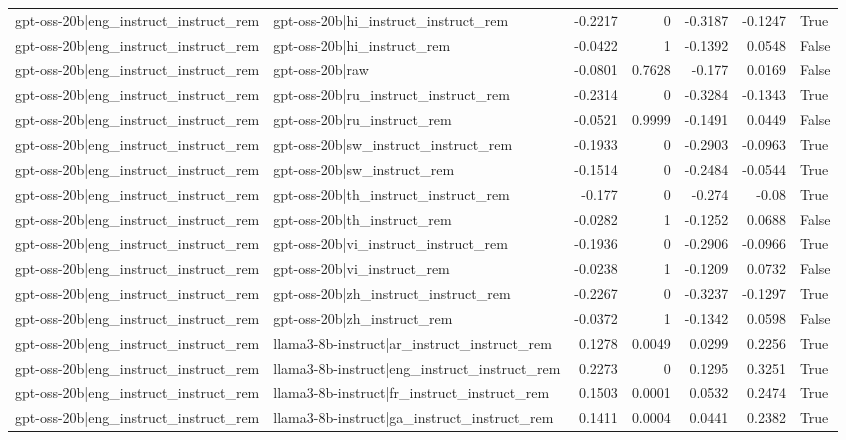 \begin{table}
\begin{tabular}{l l r r r r l}
gpt-oss-20b|eng_instruct_instruct_rem & gpt-oss-20b|hi_instruct_instruct_rem & -0.2217 & 0 & -0.3187 & -0.1247 & True \\
gpt-oss-20b|eng_instruct_instruct_rem & gpt-oss-20b|hi_instruct_rem & -0.0422 & 1 & -0.1392 & 0.0548 & False \\
gpt-oss-20b|eng_instruct_instruct_rem & gpt-oss-20b|raw & -0.0801 & 0.7628 & -0.177 & 0.0169 & False \\
gpt-oss-20b|eng_instruct_instruct_rem & gpt-oss-20b|ru_instruct_instruct_rem & -0.2314 & 0 & -0.3284 & -0.1343 & True \\
gpt-oss-20b|eng_instruct_instruct_rem & gpt-oss-20b|ru_instruct_rem & -0.0521 & 0.9999 & -0.1491 & 0.0449 & False \\
gpt-oss-20b|eng_instruct_instruct_rem & gpt-oss-20b|sw_instruct_instruct_rem & -0.1933 & 0 & -0.2903 & -0.0963 & True \\
gpt-oss-20b|eng_instruct_instruct_rem & gpt-oss-20b|sw_instruct_rem & -0.1514 & 0 & -0.2484 & -0.0544 & True \\
gpt-oss-20b|eng_instruct_instruct_rem & gpt-oss-20b|th_instruct_instruct_rem & -0.177 & 0 & -0.274 & -0.08 & True \\
gpt-oss-20b|eng_instruct_instruct_rem & gpt-oss-20b|th_instruct_rem & -0.0282 & 1 & -0.1252 & 0.0688 & False \\
gpt-oss-20b|eng_instruct_instruct_rem & gpt-oss-20b|vi_instruct_instruct_rem & -0.1936 & 0 & -0.2906 & -0.0966 & True \\
gpt-oss-20b|eng_instruct_instruct_rem & gpt-oss-20b|vi_instruct_rem & -0.0238 & 1 & -0.1209 & 0.0732 & False \\
gpt-oss-20b|eng_instruct_instruct_rem & gpt-oss-20b|zh_instruct_instruct_rem & -0.2267 & 0 & -0.3237 & -0.1297 & True \\
gpt-oss-20b|eng_instruct_instruct_rem & gpt-oss-20b|zh_instruct_rem & -0.0372 & 1 & -0.1342 & 0.0598 & False \\
gpt-oss-20b|eng_instruct_instruct_rem & llama3-8b-instruct|ar_instruct_instruct_rem & 0.1278 & 0.0049 & 0.0299 & 0.2256 & True \\
gpt-oss-20b|eng_instruct_instruct_rem & llama3-8b-instruct|eng_instruct_instruct_rem & 0.2273 & 0 & 0.1295 & 0.3251 & True \\
gpt-oss-20b|eng_instruct_instruct_rem & llama3-8b-instruct|fr_instruct_instruct_rem & 0.1503 & 0.0001 & 0.0532 & 0.2474 & True \\
gpt-oss-20b|eng_instruct_instruct_rem & llama3-8b-instruct|ga_instruct_instruct_rem & 0.1411 & 0.0004 & 0.0441 & 0.2382 & True \\

\end{tabular}
\end{table}
